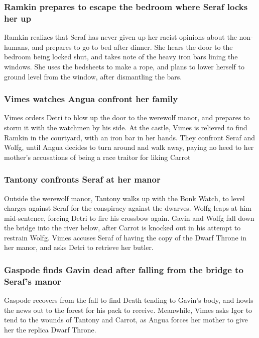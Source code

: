 \subsubsection{\Gls{Ramkin} prepares to escape the bedroom where \Gls{Seraf} locks her up}
\Gls{Ramkin} realizes that \Gls{Seraf} has never given up her racist opinions about the non-humans,
and prepares to go to bed after dinner. She hears the door to the bedroom being locked shut, and
takes note of the heavy iron bars lining the windows. She uses the bedsheets to make a rope, and
plans to lower herself to ground level from the window, after dismantling the bars.

\subsubsection{\Gls{Vimes} watches \Gls{Angua} confront her family}
\Gls{Vimes} orders \Gls{Detri} to blow up the door to the werewolf manor, and prepares to storm it
with the watchmen by his side. At the castle, \Gls{Vimes} is relieved to find \Gls{Ramkin} in the
courtyard, with an iron bar in her hands. They confront \Gls{Seraf} and \Gls{Wolfg}, until
\Gls{Angua} decides to turn around and walk away, paying no heed to her mother's accusations of
being a race traitor for liking \Gls{Carrot}

\subsubsection{\Gls{Tantony} confronts \Gls{Seraf} at her manor}
Outside the werewolf manor, \Gls{Tantony} walks up with the Bonk Watch, to level charges against
\Gls{Seraf} for the conspiracy against the dwarves. \Gls{Wolfg} leaps at him mid-sentence, forcing
\Gls{Detri} to fire his crossbow again. \Gls{Gavin} and \Gls{Wolfg} fall down the bridge into the
river below, after \Gls{Carrot} is knocked out in his attempt to restrain \Gls{Wolfg}. \Gls{Vimes}
accuses \Gls{Seraf} of having the copy of the Dwarf Throne in her manor, and asks \Gls{Detri} to
retrieve her butler.

\subsubsection{\Gls{Gaspode} finds \Gls{Gavin} dead after falling from the bridge to \Gls{Seraf}'s
    manor}
\Gls{Gaspode} recovers from the fall to find \Gls{Death} tending to \Gls{Gavin}'s body, and howls
the news out to the forest for his pack to receive. Meanwhile, \Gls{Vimes} asks \Gls{Igor} to tend
to the wounds of \Gls{Tantony} and \Gls{Carrot}, as \Gls{Angua} forces her mother to give her the
replica Dwarf Throne.

